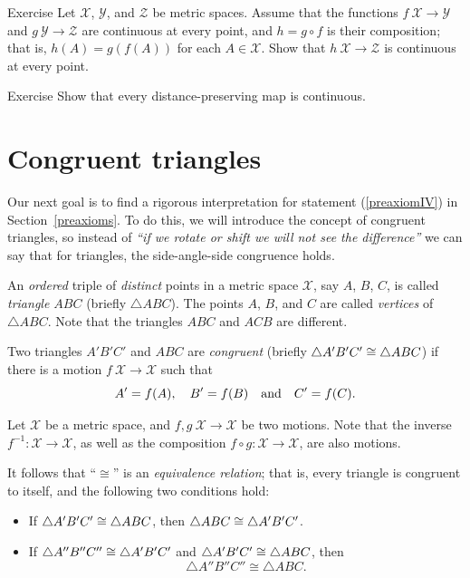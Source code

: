 \begin{thm}[!]{Exercise}\label{ex:comp+cont}
Let $\mathcal{X}$, $\mathcal{Y}$, and $\mathcal{Z}$ be metric spaces.
Assume that the functions $f\:\mathcal{X}\to\mathcal{Y}$
and $g\:\mathcal{Y}\to\mathcal{Z}$ are continuous at every point,
and $h=g\circ f$ is their composition;
that is, $h(A)=g(f(A))$ for each $A\in \mathcal{X}$.
Show that $h\:\mathcal{X}\to\mathcal{Z}$ is continuous at every point.
\end{thm}

\begin{thm}[!]{Exercise}\label{ex:isom-cont}
Show that every distance-preserving map is continuous.
\end{thm}

\section{Congruent triangles}
\label{sec:cong-triangles}

Our next goal is to find a rigorous interpretation for statement (\ref{preaxiomIV}) in Section~\ref{preaxioms}.
To do this, we will introduce the concept of congruent triangles,
so instead of \textit{``if we rotate or shift we will not see the difference''} we can say that for triangles, the side-angle-side congruence holds.

An \textit{ordered} triple of \textit{distinct} points in a metric space $\mathcal{X}$, 
say $A$, $B$, $C$,
is called \emph{triangle $ABC$}\label{page:def:triangle} (briefly $\triangle A B C$).
The points $A$, $B$, and $C$ are called \emph{vertices} of $\triangle ABC$.
Note that the triangles $A B C$ and $A C B$ are different.

Two triangles $A' B' C'$ and $A B C$ are  
\emph{congruent}
(briefly  $\triangle A' B' C'\z\cong\triangle A B C$) if there is a motion $f\:\mathcal{X}\to\mathcal{X}$ such that 
\[A'\z=f(A),
\quad
B'=f(B)
\quad
\text{and}
\quad
C'=f(C).\]

Let $\mathcal X$ be a metric space,
and $f,g\:\mathcal X\to\mathcal X$ be two motions.
Note that the inverse $f^{-1}:\mathcal X\to\mathcal X$,
as well as the composition $f\circ g:\mathcal X\to\mathcal X$,
are also motions.

It follows that ``$\cong$'' is an \emph{equivalence relation};
that is, every triangle is congruent to itself,
and the following two conditions hold:
\begin{itemize} 
\item If $\triangle A' B' C'\z\cong\triangle A B C$, then $\triangle A B C\z\cong\triangle A' B' C'$.
\item If $\triangle A'' B'' C''\z\cong\triangle A' B' C'$ and $\triangle A' B' C'\z\cong\triangle A B C$,
then 
$$\triangle A'' B'' C''\cong\triangle A B C.$$
\end{itemize}

